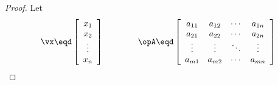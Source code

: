 \begin{theorem}
\label{thm:mc_Axx}
\end{theorem}
\begin{proof}
Let 
\[
   \vx \eqd
   \left[
      \begin{array}{c}
         x_1 \\
         x_2 \\
         \vdots \\
         x_n
      \end{array}
   \right]
   \qquad\qquad
   \opA \eqd
   \left[\begin{array}{ccccc}
     a_{11}   & a_{12}   & \cdots & a_{1n}   \\
     a_{21}   & a_{22}   & \cdots & a_{2n}   \\
     \vdots   & \vdots   & \ddots & \vdots \\
     a_{m1}   & a_{m2}   & \cdots & a_{mn}
   \end{array}\right]
\]


\end{proof}
